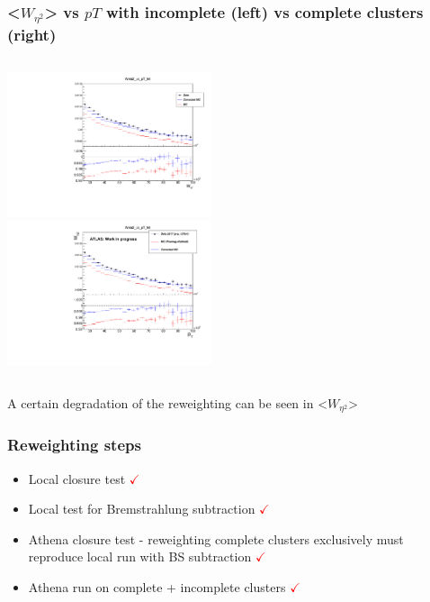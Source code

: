 \documentclass{beamer}
\begin{document}
\begin{frame}
\frametitle{ <$W_{\eta^2}$> vs $pT$ with incomplete  (left) vs complete clusters (right)}

\begin{columns}[t]
\centering
\includegraphics[width=6cm]{Weta2_vs_pT_IntSic.pdf}\\
\centering
\includegraphics[width=6cm]{Weta2_vs_pT_Int.pdf}\\
\end{columns}
A certain degradation of the reweighting can be seen in <$W_{\eta^2}$>

\end{frame}

\begin{frame}
\frametitle{Reweighting steps}
\begin{itemize}
\item Local closure test \textcolor{red}{ $\checkmark$}\\
\item Local test for Bremstrahlung subtraction \textcolor{red}{ $\checkmark$}\\
\item Athena closure test - reweighting complete clusters exclusively must reproduce local run with BS subtraction \textcolor{red}{ $\checkmark$}\\
\item Athena run on complete + incomplete clusters \textcolor{red}{ $\checkmark$}\\


\end{itemize}
\end{frame}
\end{document}
